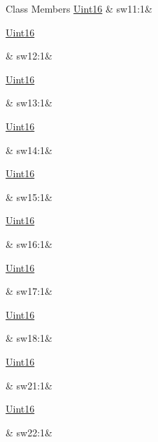 \begin{DoxyFields}{Class Members}
\hypertarget{a00001_a68b6259d9c183b9d3a326c93fc6f999c}{\hyperlink{a00001_aae7407b021d43f7193a81a58cfb3e297}{Uint16}}\label{a00001_a68b6259d9c183b9d3a326c93fc6f999c}
&
sw11\+:1&
\\
\hline

\hypertarget{a00001_a5a4aa1c2b9788df9411898b18b18da70}{\hyperlink{a00001_aae7407b021d43f7193a81a58cfb3e297}{Uint16}}\label{a00001_a5a4aa1c2b9788df9411898b18b18da70}
&
sw12\+:1&
\\
\hline

\hypertarget{a00001_a4da0473550d3708a8b9b67e18a2801b0}{\hyperlink{a00001_aae7407b021d43f7193a81a58cfb3e297}{Uint16}}\label{a00001_a4da0473550d3708a8b9b67e18a2801b0}
&
sw13\+:1&
\\
\hline

\hypertarget{a00001_aa8d6d004dc9c3d1607b3d7f537167572}{\hyperlink{a00001_aae7407b021d43f7193a81a58cfb3e297}{Uint16}}\label{a00001_aa8d6d004dc9c3d1607b3d7f537167572}
&
sw14\+:1&
\\
\hline

\hypertarget{a00001_a53d3e65914a243c941d9dcec40f7bccb}{\hyperlink{a00001_aae7407b021d43f7193a81a58cfb3e297}{Uint16}}\label{a00001_a53d3e65914a243c941d9dcec40f7bccb}
&
sw15\+:1&
\\
\hline

\hypertarget{a00001_a48bbc3265cfd9298006286fdc195e9b2}{\hyperlink{a00001_aae7407b021d43f7193a81a58cfb3e297}{Uint16}}\label{a00001_a48bbc3265cfd9298006286fdc195e9b2}
&
sw16\+:1&
\\
\hline

\hypertarget{a00001_ab8ac5314facc13405040767effa9a5f2}{\hyperlink{a00001_aae7407b021d43f7193a81a58cfb3e297}{Uint16}}\label{a00001_ab8ac5314facc13405040767effa9a5f2}
&
sw17\+:1&
\\
\hline

\hypertarget{a00001_adcd04cb1c439b2f60f2b57c0bad90b6e}{\hyperlink{a00001_aae7407b021d43f7193a81a58cfb3e297}{Uint16}}\label{a00001_adcd04cb1c439b2f60f2b57c0bad90b6e}
&
sw18\+:1&
\\
\hline

\hypertarget{a00001_a295af9e7a189a1bd8829f91774031372}{\hyperlink{a00001_aae7407b021d43f7193a81a58cfb3e297}{Uint16}}\label{a00001_a295af9e7a189a1bd8829f91774031372}
&
sw21\+:1&
\\
\hline

\hypertarget{a00001_a72960a928fbc4793d9e580f25a92e273}{\hyperlink{a00001_aae7407b021d43f7193a81a58cfb3e297}{Uint16}}\label{a00001_a72960a928fbc4793d9e580f25a92e273}
&
sw22\+:1&
\\
\hline


\end{DoxyFields}
